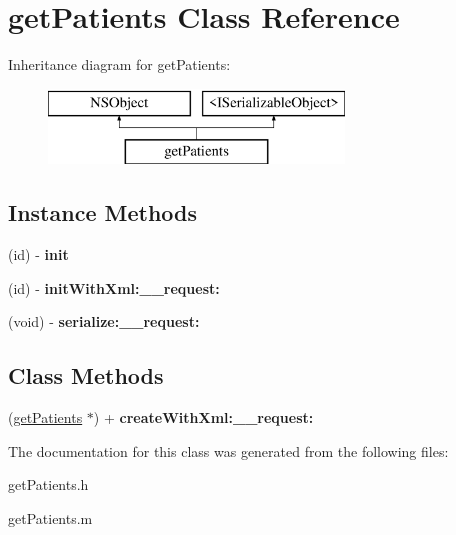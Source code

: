\hypertarget{interfaceget_patients}{}\section{get\+Patients Class Reference}
\label{interfaceget_patients}
Inheritance diagram for get\+Patients\+:\begin{figure}[H]
\begin{center}
\leavevmode
\includegraphics[height=2.000000cm]{interfaceget_patients}
\end{center}
\end{figure}
\subsection*{Instance Methods}
\begin{DoxyCompactItemize}
\item 
\hypertarget{interfaceget_patients_aa701bd06efbf7289c2fe9f80d89f1c70}{}(id) -\/ {\bfseries init}\label{interfaceget_patients_aa701bd06efbf7289c2fe9f80d89f1c70}

\item 
\hypertarget{interfaceget_patients_a35dce9b9fd6abb76b2a2262d075afe61}{}(id) -\/ {\bfseries init\+With\+Xml\+:\+\_\+\+\_\+request\+:}\label{interfaceget_patients_a35dce9b9fd6abb76b2a2262d075afe61}

\item 
\hypertarget{interfaceget_patients_a4d3d806e07cd7ad90f360c6f0f341250}{}(void) -\/ {\bfseries serialize\+:\+\_\+\+\_\+request\+:}\label{interfaceget_patients_a4d3d806e07cd7ad90f360c6f0f341250}

\end{DoxyCompactItemize}
\subsection*{Class Methods}
\begin{DoxyCompactItemize}
\item 
\hypertarget{interfaceget_patients_adb36c18c7f2f7e6f0f83cf2783a8b33d}{}(\hyperlink{interfaceget_patients}{get\+Patients} $\ast$) + {\bfseries create\+With\+Xml\+:\+\_\+\+\_\+request\+:}\label{interfaceget_patients_adb36c18c7f2f7e6f0f83cf2783a8b33d}

\end{DoxyCompactItemize}


The documentation for this class was generated from the following files\+:\begin{DoxyCompactItemize}
\item 
get\+Patients.\+h\item 
get\+Patients.\+m\end{DoxyCompactItemize}
